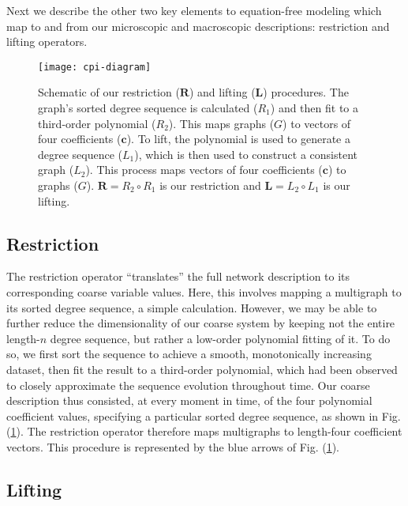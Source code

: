   Next we describe the other two key elements to equation-free
  modeling which map to and from our microscopic and macroscopic
  descriptions: restriction and lifting operators.

  \begin{figure}
    \centering
    \texttt{[image: cpi-diagram]}
    \caption[Schematic of multigraph's lifting and restricting
    procedures]{Schematic of our restriction ($\mathbf{R}$) and
      lifting ($\mathbf{L}$) procedures. The graph's sorted degree
      sequence is calculated ($R_1$) and then fit to a third-order
      polynomial ($R_2$). This maps graphs ($G$) to vectors of four
      coefficients ($\mathbf{c}$). To lift, the polynomial is used to
      generate a degree sequence ($L_1$), which is then used to
      construct a consistent graph ($L_2$). This process maps vectors
      of four coefficients ($\mathbf{c}$) to graphs ($G$).
      $\mathbf{R} = R_2 \circ R_1 $ is our restriction and
      $\mathbf{L} = L_2 \circ L_1$ is our
      lifting. \label{fig:cpi-diagram}}
  \end{figure}


  \subsection{Restriction}

  The restriction operator ``translates'' the full network description
  to its corresponding coarse variable values.
  Here, this involves mapping a multigraph to its sorted degree
  sequence, a simple calculation.
  However, we may be able to further reduce the dimensionality of our
  coarse system by keeping not the entire length-$n$ degree sequence,
  but rather a low-order polynomial fitting of it.
  To do so, we first sort the sequence to achieve a smooth,
  monotonically increasing dataset, then fit the result to a
  third-order polynomial, which had been observed to closely
  approximate the sequence evolution throughout time.
  Our coarse description thus consisted, at every moment in time, of
  the four polynomial coefficient values, specifying a particular
  sorted degree sequence, as shown in Fig. (\ref{fig:cpi-diagram}).
  The restriction operator therefore maps multigraphs to length-four
  coefficient vectors.
  This procedure is represented by the blue arrows of
  Fig. (\ref{fig:cpi-diagram}).

  \subsection{Lifting}

